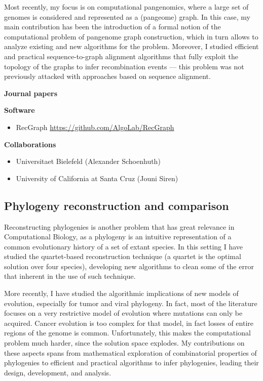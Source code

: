 \documentclass[11pt,a4paper,roman]{moderncv}
\begin{document}
Most recently, my focus is on computational pangenomics, where a large set of
genomes is considered and represented as a (pangeome) graph.
In this case, my main contribution has been the introduction of a formal notion of the computational
problem of pangenome graph construction, which in turn allows to analyze
existing and new algorithms for the problem.
Moreover, I studied efficient and practical
sequence-to-graph alignment algorithms that fully exploit the topology of the
graphs to infer recombination events --- this problem was not previously
attacked with approaches based on sequence alignment.


\textbf{Journal papers}

\cite{baaijensComputationalGraphPangenomics2022}
\cite{DBLP:journals/bioinformatics/DentiPPCVRB21}
\cite{DBLP:journals/ipl/BonizzoniVDP10}
\cite{DBLP:journals/tcbb/BonizzoniVDFRV07}
\cite{DBLP:journals/informs/JustV04}
\cite{DBLP:journals/dam/BonizzoniVM01}
\cite{DBLP:journals/tcs/BonizzoniV01}

\textbf{Software}

\begin{itemize}
\item
      RecGraph \url{https://github.com/AlgoLab/RecGraph}
\end{itemize}

\textbf{Collaborations}

\begin{itemize}
\item
      Universitaet Bielefeld (Alexander Schoenhuth)
\item
      University of California at Santa Cruz (Jouni Siren)
\end{itemize}

\subsection{Phylogeny reconstruction and
comparison}\label{phylogeny-reconstruction-and-comparison}

Reconstructing phylogenies is another problem that has great relevance
in Computational Biology, as a phylogeny is an intuitive representation
of a common evolutionary history of a set of extant species. In this
setting I have studied the quartet-based reconstruction technique (a
quartet is the optimal solution over four species), developing new
algorithms to clean some of the error that inherent in the use of such
technique.

More recently, I have studied the algorithmic implications of new models of
evolution, especially for tumor and viral phylogeny.
In fact, most of the literature focuses on a very restrictive model of evolution
where mutations can only be acquired.
Cancer evolution is too complex for that model, in fact losses of entire regions
of the genome is common.
Unfortunately, this makes the computational problem much harder, since the
solution space explodes.
My contributions on these aspects spans from mathematical exploration of
combinatorial properties of phylogenies to efficient and practical algorithms to
infer phylogenies, leading their design, development, and analysis.
\end{document}
